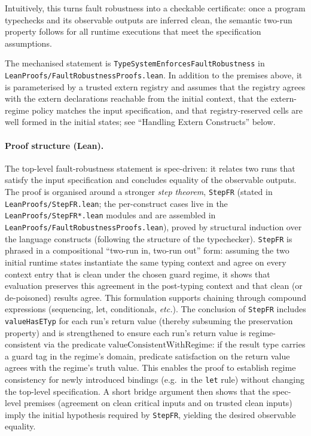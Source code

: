\documentclass[12pt]{article}
\begin{document}
Intuitively, this turns fault robustness into a checkable certificate: once a program typechecks and
its observable outputs are inferred clean, the semantic two-run property follows for all runtime
executions that meet the specification assumptions.

The mechanised statement is \texttt{TypeSystemEnforcesFaultRobustness} in
\texttt{LeanProofs/FaultRobustnessProofs.lean}. In addition to the premises
above, it is parameterised by a trusted extern registry and assumes that the
registry agrees with the extern declarations reachable from the initial
context, that the extern-regime policy matches the input specification, and
that registry-reserved cells are well formed in the initial states; see
``Handling Extern Constructs'' below.

\paragraph{Proof structure (Lean).}
The top-level fault-robustness statement is spec-driven: it relates two runs
that satisfy the input specification and concludes equality of the observable
outputs. The proof is organised around a stronger \emph{step theorem},
\texttt{StepFR} (stated in \texttt{LeanProofs/StepFR.lean}; the per-construct
cases live in the \texttt{LeanProofs/StepFR*.lean} modules and are assembled in
\texttt{LeanProofs/FaultRobustnessProofs.lean}), proved by
structural induction over the language constructs (following the structure of
the typechecker). \texttt{StepFR} is phrased in a compositional ``two-run in,
two-run out'' form: assuming the two initial runtime states instantiate the same
typing context and agree on every context entry that is clean under the chosen
guard regime, it shows that evaluation preserves this agreement in the
post-typing context and that clean (or de-poisoned) results agree. This
formulation supports chaining through compound expressions (sequencing, let,
conditionals, \emph{etc.}). The conclusion of \texttt{StepFR} includes
\texttt{valueHasETyp} for each run's return value (thereby subsuming the
preservation property) and is strengthened to ensure each run's return value is
regime-consistent via the predicate $\text{valueConsistentWithRegime}$: if the result type carries a guard tag in
the regime's domain, predicate satisfaction on the return value agrees with
the regime's truth value. This enables the proof to establish regime
consistency for newly introduced bindings (e.g.\ in the \texttt{let} rule)
without changing the top-level specification. A short bridge
argument then shows that the spec-level premises (agreement on clean critical
inputs and on trusted clean inputs) imply the initial hypothesis required by
\texttt{StepFR}, yielding the desired observable equality.
\end{document}
